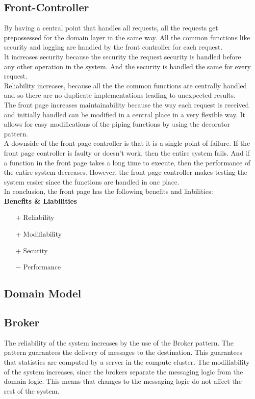 \subsection*{Front-Controller}
By having a central point that handles all requests, all the requests get prepossessed for the domain layer in the same way. All the common functions like security and logging are handled by the front controller for each request.\\
It increases security because the security the request security is handled before any other operation in the system. And the security is handled the same for every request.\\
Reliability increases, because all the the common functions are centrally handled and so there are no duplicate implementations leading to unexpected results. \\
The front page increases maintainability because the way each request is received and initially handled can be modified in a central place in a very flexible way. It allows for easy modifications of the piping functions by using the decorator pattern.\\
A downside of the front page controller is that it is a single point of failure. If the front page controller is faulty or doesn't work, then the entire system fails. And if a function in the front page takes a long time to execute, then the performance of the entire system decreases. However, the front page controller makes testing the system easier since the functions are handled in one place.\\

In conclusion, the front page has the following benefits and liabilities:\\
\textbf{Benefits \& Liabilities} ~
\begin{itemize}
\item[+] Reliability
\item[+] Modifiability
\item[+] Security
\item[$-$] Performance
\end{itemize}

\subsection*{Domain Model}
\subsection*{Broker}
The reliability of the system increases by the use of the Broker pattern. The pattern guarantees the delivery of messages to the destination. This guarantees that statistics are computed by a server in the compute cluster.
The modifiability of the system increases, since the brokers separate the messaging logic from the domain logic. This means that changes to the messaging logic do not affect the rest of the system.

